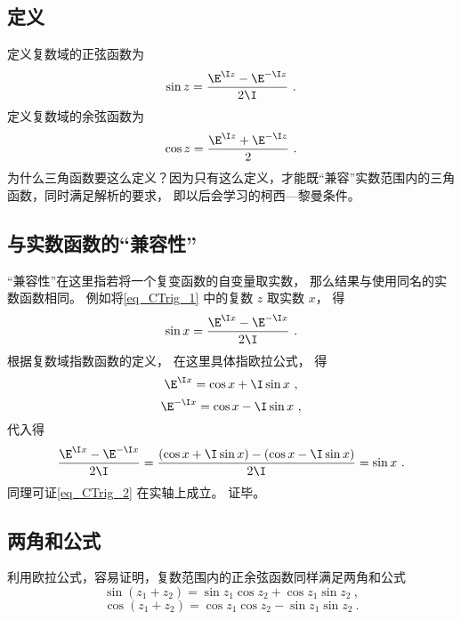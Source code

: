 
\subsection{定义}
定义复数域的正弦函数为
\begin{equation}\label{eq_CTrig_1}
\sin z = \frac{\E^{\I z} - \E^{-\I z}}{2\I}~.
\end{equation}
定义复数域的余弦函数为
\begin{equation}\label{eq_CTrig_2}
\cos z = \frac{\E^{\I z} + \E^{-\I z}}{2}~.
\end{equation}
为什么三角函数要这么定义？因为只有这么定义，才能既“兼容”实数范围内的三角函数，同时满足解析的要求， 即以后会学习的柯西—黎曼条件。

\subsection{与实数函数的“兼容性”}
“兼容性”在这里指若将一个复变函数的自变量取实数， 那么结果与使用同名的实数函数相同。 例如将\autoref{eq_CTrig_1} 中的复数 $z$ 取实数 $x$， 得
\begin{equation}
\sin x = \frac{\E^{\I x} - \E^{-\I x}}{2\I}~.
\end{equation} 
根据复数域指数函数的定义， 在这里具体指欧拉公式， 得
\begin{equation}
\E^{\I x} = \cos x + \I\sin x~,
\end{equation} 
\begin{equation}
\E^{-\I x} = \cos x - \I \sin x~,
\end{equation} 
代入得
\begin{equation}
\frac{\E^{\I x} - \E^{-\I x}}{2\I} = \frac{(\cos x + \I\sin x) - (\cos x - \I\sin x)}{2\I} = \sin x~.
\end{equation}  
同理可证\autoref{eq_CTrig_2} 在实轴上成立。 证毕。

\subsection{两角和公式}
利用欧拉公式，容易证明，复数范围内的正余弦函数同样满足两角和公式
\begin{equation}\label{eq_CTrig_3}
\sin(z_1 + z_2) = \sin {z_1}\cos {z_2} + \cos {z_1}\sin {z_2}~,
\end{equation}
\begin{equation}\label{eq_CTrig_4}
\cos (z_1 + z_2) = \cos {z_1}\cos {z_2} - \sin {z_1}\sin {z_2}~.
\end{equation}
